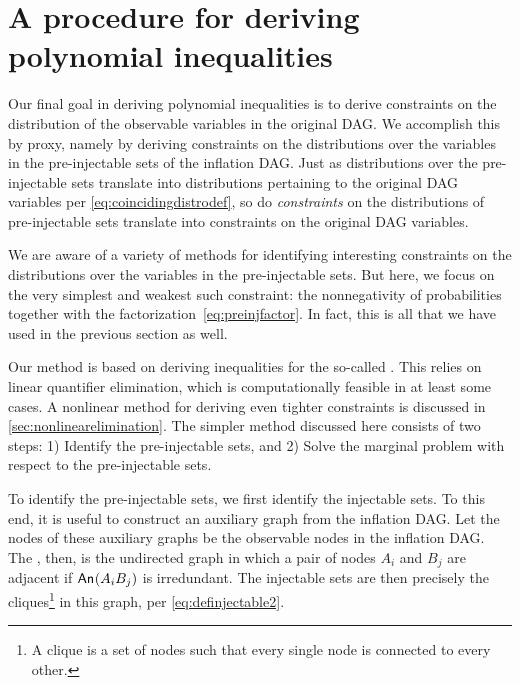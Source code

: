 \section{A procedure for deriving polynomial inequalities}
\label{sec:ineqs}


Our final goal in deriving polynomial inequalities is to derive constraints on the distribution of the observable variables in the original DAG. We accomplish this by proxy, namely by deriving constraints on the distributions over the variables in the pre-injectable sets of the inflation DAG. Just as distributions over the pre-injectable sets translate into distributions pertaining to the original DAG variables per \cref{eq:coincidingdistrodef}, so do \emph{constraints} on the distributions of pre-injectable sets translate into constraints on the original DAG variables.

We are aware of a variety of methods for identifying interesting constraints on the distributions over the variables in the pre-injectable sets. But here, we focus on the very simplest and weakest such constraint: the nonnegativity of probabilities together with the factorization~\cref{eq:preinjfactor}. In fact, this is all that we have used in the previous section as well.

Our method is based on deriving inequalities for the so-called . This relies on linear quantifier elimination, which is computationally feasible in at least some cases. A nonlinear method for deriving even tighter constraints is discussed in \cref{sec:nonlinearelimination}. The simpler method discussed here consists of two steps: 1) Identify the pre-injectable sets, and 2) Solve the marginal problem with respect to the pre-injectable sets.


\label{step:findpreinjectable}\par\smallskip\nobreak

To identify the pre-injectable sets, we first identify the injectable sets. To this end, it is useful to construct an auxiliary graph from the inflation DAG. Let the nodes of these auxiliary graphs be the observable nodes in the inflation DAG. The , then, is the undirected graph in which a pair of nodes $A_i$ and $B_j$ are adjacent if  ${\mathsf{An}_{}}\lparen A_i B_j\rparen$ is irredundant. The injectable sets are then precisely the cliques\footnote{A clique is a set of nodes such that every single node is connected to every other.} in this graph, per \cref{eq:definjectable2}. 

